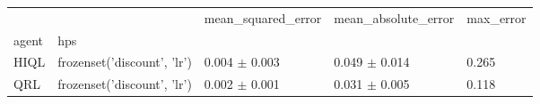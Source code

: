 \begin{tabular}{lllll}
\toprule
 &  & mean_squared_error & mean_absolute_error & max_error \\
agent & hps &  &  &  \\
\midrule
HIQL & frozenset({'discount', 'lr'}) & 0.004 $\pm$ 0.003 & 0.049 $\pm$ 0.014 & 0.265 \\
\cline{1-5}
QRL & frozenset({'discount', 'lr'}) & 0.002 $\pm$ 0.001 & 0.031 $\pm$ 0.005 & 0.118 \\
\cline{1-5}
\bottomrule
\end{tabular}
